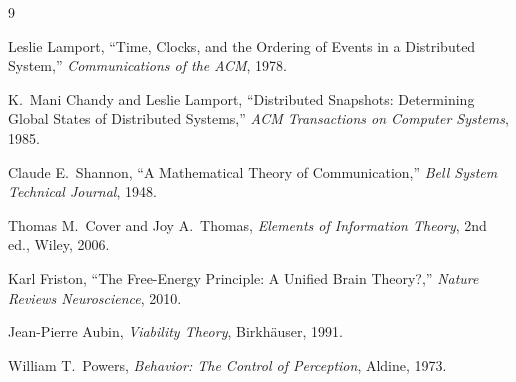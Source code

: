 \begin{thebibliography}{9}

Leslie Lamport, ``Time, Clocks, and the Ordering of Events in a
Distributed System,'' \textit{Communications of the ACM}, 1978.

K.~Mani Chandy and Leslie Lamport, ``Distributed Snapshots: Determining
Global States of Distributed Systems,'' \textit{ACM Transactions on
Computer Systems}, 1985.

Claude E.~Shannon, ``A Mathematical Theory of Communication,'' \textit{Bell
System Technical Journal}, 1948.

Thomas M.~Cover and Joy A.~Thomas, \textit{Elements of Information
Theory}, 2nd ed., Wiley, 2006.

Karl Friston, ``The Free-Energy Principle: A Unified Brain Theory?,''
\textit{Nature Reviews Neuroscience}, 2010.

Jean-Pierre Aubin, \textit{Viability Theory}, Birkh\"auser, 1991.

William T.~Powers, \textit{Behavior: The Control of Perception}, Aldine,
1973.

\end{thebibliography}

